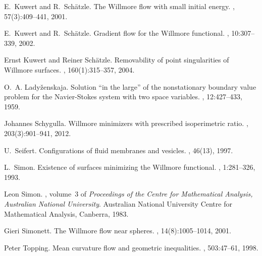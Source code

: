 \documentclass[reqno,makeidx,12pt]{amsart}
\theoremstyle{note}
\theoremstyle{definition}
\begin{document}
\begin{thebibliography}{10}
E.~Kuwert and R.~Sch{\"a}tzle.
\newblock The {W}illmore flow with small initial energy.
, 57(3):409--441, 2001.

E.~Kuwert and R.~Sch{\"a}tzle.
\newblock Gradient flow for the {W}illmore functional.
, 10:307--339, 2002.

Ernst Kuwert and Reiner Sch{\"a}tzle.
\newblock Removability of point singularities of {W}illmore surfaces.
, 160(1):315--357, 2004.

O.~A. Lady{\v{z}}enskaja.
\newblock Solution ``in the large'' of the nonstationary boundary value problem
  for the {N}avier-{S}tokes system with two space variables.
, 12:427--433, 1959.

Johannes Schygulla.
\newblock Willmore minimizers with prescribed isoperimetric ratio.
, 203(3):901--941, 2012.

U.~Seifert.
\newblock Configurations of fluid membranes and vesicles.
, 46(13), 1997.

L.~Simon.
\newblock Existence of surfaces minimizing the {W}illmore functional.
, 1:281--326, 1993.

Leon Simon.
, volume~3 of {\em
  Proceedings of the Centre for Mathematical Analysis, Australian National
  University}.
\newblock Australian National University Centre for Mathematical Analysis,
  Canberra, 1983.

Gieri Simonett.
\newblock The {W}illmore flow near spheres.
, 14(8):1005--1014, 2001.

Peter Topping.
\newblock Mean curvature flow and geometric inequalities.
, 503:47--61, 1998.

\end{thebibliography}
\end{document}
